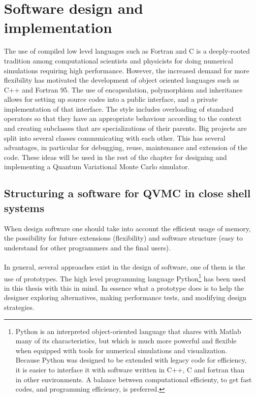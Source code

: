 
\chapter{Software design and implementation}\label{implementation}
The use of compiled low level languages such as Fortran and C is a deeply-rooted tradition among computational scientists and physicists for doing numerical simulations requiring high performance. However, the increased demand for more flexibility has motivated the development of object oriented languages such as C++  and Fortran 95. The use of encapsulation, polymorphism and inheritance allows for setting up source codes into a public interface, and a private implementation of that interface. The style includes overloading of standard operators so that they have an appropriate behaviour according to the context and creating subclasses that are specializations of their parents. Big projects are split into several classes communicating with each other.  This has several advantages, in particular 
for debugging, reuse, maintenance and extension of the code. These ideas will be used in the rest of the chapter for designing and implementing a Quantum Variational Monte Carlo simulator. %

\section{Structuring a software for QVMC in close shell systems}\label{softwareStructure}
When design software one should take into account the efficient usage of memory, the possibility 
for future extensions (flexibility) and software structure (easy to understand for other programmers and the final users)\cite{Shapira2006,Langtangen2003}. \\
\\
In general, several approaches exist in the design of software, one of them is the use of prototypes. The high level programming language Python\footnote{Python is an interpreted object-oriented language that shares with Matlab many of its characteristics, but which is much more powerful and flexible when equipped with tools for numerical simulations and visualization. Because Python was designed to be extended with legacy code for efficiency, it is easier to interface it with  software written in C++, C and fortran than in other environments. A balance between computational efficienty, to get fast codes, and programming efficiency, is preferred. 

} has been used in this thesis with this in mind. In essence what a prototype does is to help the designer exploring alternatives, making performance tests, and modifying design strategies.

